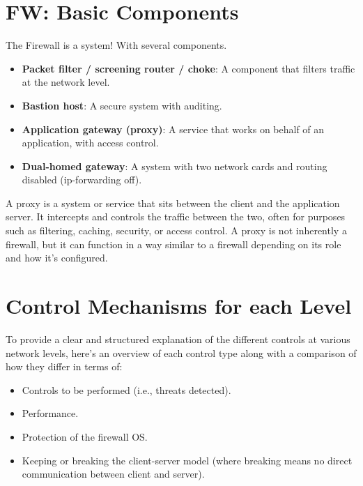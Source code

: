 \section*{FW: Basic Components}
\begin{tcolorbox}[colback=red!10!white, colframe=red!70!black, coltitle=white, title=Beware]
The Firewall is a system! With several components.
\end{tcolorbox}

\begin{itemize}
    \item \textbf{Packet filter / screening router / choke}: A component that filters traffic at the network level.
    \item \textbf{Bastion host}: A secure system with auditing.
    \item \textbf{Application gateway (proxy)}: A service that works on behalf of an application, with access control.
    \item \textbf{Dual-homed gateway}: A system with two network cards and routing disabled (ip-forwarding off).
\end{itemize}

\begin{tcolorbox}[colback=blue!10!white, colframe=blue!50!white, title=What is a Proxy]
    A proxy is a system or service that sits between the client and the application server. It intercepts and controls the traffic between the two, often for purposes such as filtering, caching, security, or access control. A proxy is not inherently a firewall, but it can function in a way similar to a firewall depending on its role and how it’s configured.
\end{tcolorbox}

\section{Control Mechanisms for each Level}
To provide a clear and structured explanation of the different controls at various network levels, here’s an overview of each control type along with a comparison of how they differ in terms of:
\begin{itemize}
    \item Controls to be performed (i.e., threats detected).
    \item Performance.
    \item Protection of the firewall OS.
    \item Keeping or breaking the client-server model (where breaking means no direct communication between client and server).
\end{itemize}

